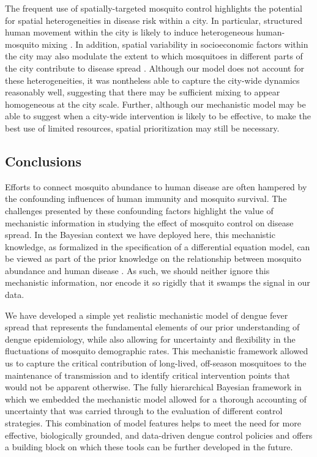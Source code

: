 \documentclass[10pt,letterpaper]{article}
\begin{document}
The frequent use of spatially-targeted mosquito control highlights the potential for spatial heterogeneities in disease risk within a city.
In particular, structured human movement within the city is likely to induce heterogeneous human-mosquito mixing \cite{Adams2009, Cosner2009a, Stoddard2009}.
In addition, spatial variability in socioeconomic factors within the city may also modulate the extent to which mosquitoes in different parts of the city contribute to disease spread \cite{Mondini2008, Honorio2009, Hu2012, DeMattosAlmeida2007}.
Although our model does not account for these heterogeneities, it was nontheless able to capture the city-wide dynamics reasonably well, suggesting that there may be sufficient mixing to appear homogeneous at the city scale.
Further, although our mechanistic model may be able to suggest when a city-wide intervention is likely to be effective, to make the best use of limited resources, spatial prioritization may still be necessary.

\subsection*{Conclusions}

Efforts to connect mosquito abundance to human disease are often hampered by the confounding influences of human immunity and mosquito survival.
The challenges presented by these confounding factors highlight the value of mechanistic information in studying the effect of mosquito control on disease spread.
In the Bayesian context we have deployed here, this mechanistic knowledge, as formalized in the specification of a differential equation model, can be viewed as part of the prior knowledge on the relationship between mosquito abundance and human disease \cite{Ellner1998, Wikle2010}.
As such, we should neither ignore this mechanistic information, nor encode it so rigidly that it swamps the signal in our data.

We have developed a simple yet realistic mechanistic model of dengue fever spread that represents the fundamental elements of our prior understanding of dengue epidemiology, while also allowing for uncertainty and flexibility in the fluctuations of mosquito demographic rates.
This mechanistic framework allowed us to capture the critical contribution of long-lived, off-season mosquitoes to the maintenance of transmission and to identify critical intervention points that would not be apparent otherwise.
The fully hierarchical Bayesian framework in which we embedded the mechanistic model allowed for a thorough accounting of uncertainty that was carried through to the evaluation of different control strategies.
This combination of model features helps to meet the need for more effective, biologically grounded, and data-driven dengue control policies and offers a building block on which these tools can be further developed in the future.
\end{document}
